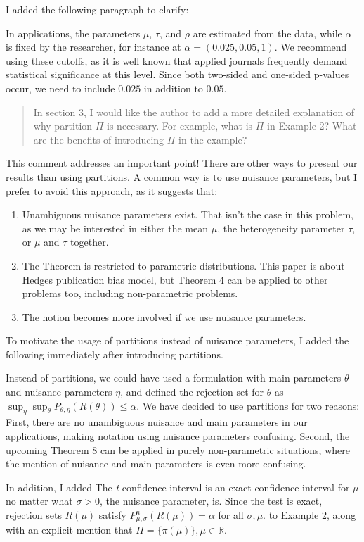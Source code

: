 \documentclass[a4paper]{article}
\begin{document}
I added the following paragraph to clarify:

{\color{red}In applications, the parameters $\mu$, $\tau$, and $\rho$ are estimated from the data, while $\alpha$ is fixed by the researcher, for instance at $\alpha = (0.025, 0.05, 1)$. We recommend using these cutoffs, as it is well known that applied journals frequently demand statistical significance at this level. Since both two-sided and one-sided p-values occur, we need to include $0.025$ in addition to $0.05$.}

\begin{quote}
In section 3, I would like the author to add a more detailed explanation of why partition $\Pi$ is necessary. For example, what is $\Pi$ in Example 2? What are the benefits of introducing $\Pi$ in the example?
\end{quote}

This comment addresses an important point! There are other ways to present our results than using partitions. A common way is to use nuisance parameters, but I prefer to avoid this approach, as it suggests that:
\begin{enumerate}
\item Unambiguous nuisance parameters exist. That isn't the case in this problem, as we may be interested in either the mean $\mu$, the heterogeneity parameter $\tau$, or $\mu$ and $\tau$  together. 
\item The Theorem is restricted to parametric distributions. This paper is about Hedges publication bias model, but Theorem 4 can be applied to other problems too, including non-parametric problems. 
\item The notion becomes more involved if we use nuisance parameters.
\end{enumerate}
To motivate the usage of partitions instead of nuisance parameters, I added the following immediately after introducing partitions.

{\color{red} Instead of partitions, we could have used a formulation with main parameters $\theta$ and nuisance parameters $\eta$, and defined the rejection set for $\theta$ as $\sup_{\eta}\sup_{\theta}P_{\theta,\eta}(R(\theta))\leq\alpha$. We have decided to use partitions for two reasons: First, there are no unambiguous nuisance and main parameters in our applications, making notation using nuisance parameters confusing. Second, the upcoming Theorem 8 can be applied in purely non-parametric situations, where the mention of nuisance and main parameters is even more confusing.} 

In addition, I added {\color{red} The \emph{t}-confidence interval is an exact confidence interval for $\mu$ no matter what $\sigma>0$, the nuisance parameter, is. Since the test is exact, rejection sets $R(\mu)$ satisfy $P^n_{\mu,\sigma}(R(\mu))=\alpha$ for all $\sigma,\mu$.} to Example 2, along with an explicit mention that {\color{red} $\Pi = \{\pi(\mu)\},\mu\in\mathbb{R}$.}
\end{document}
